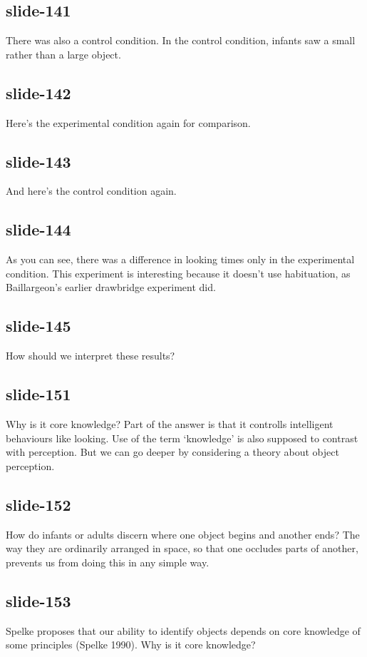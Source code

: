 \documentclass[12pt,\papersize]{extarticle}
\begin{document}
 
\subsection{slide-141}
There was also a control condition.
In the control condition, infants saw a small rather than a large object.
 
 
\subsection{slide-142}
Here's the experimental condition again for comparison.
 
 
\subsection{slide-143}
And here's the control condition again.
 
 
\subsection{slide-144}
As you can see, there was a difference in looking times only in the experimental condition.
This experiment is interesting because it doesn't use habituation, as Baillargeon's earlier drawbridge experiment did.
 
 
\subsection{slide-145}
How should we interpret these results?
 
 
\subsection{slide-151}
Why is it core knowledge?
Part of the answer is that it controlls intelligent behaviours like looking.
Use of the term ‘knowledge’ is also supposed to contrast with perception.
But we can go deeper by considering a theory about object perception.
 
 
\subsection{slide-152}
How do infants or adults discern where one object begins and another ends?
The way they are ordinarily arranged in space, so that one occludes parts of another, prevents us from doing this in any simple way.
 
 
\subsection{slide-153}
Spelke proposes that our ability to identify objects depends on core knowledge of some principles (Spelke 1990).
Why is it core knowledge?
 
\end{document}
